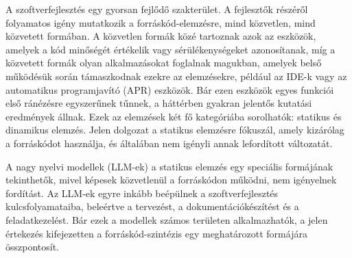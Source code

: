 \documentclass[12pt,a4paper]{extarticle}
\begin{document}
A szoftverfejlesztés egy gyorsan fejlődő szakterület.
A fejlesztők részéről folyamatos igény mutatkozik a forráskód-elemzésre, mind közvetlen, mind közvetett formában.
A közvetlen formák közé tartoznak azok az eszközök, amelyek a kód minőségét értékelik vagy sé\-rü\-lé\-keny\-sé\-ge\-ket azonosítanak, míg a közvetett formák olyan alkalmazásokat foglalnak magukban, amelyek belső működésük során támaszkodnak ezekre az elemzésekre, például az IDE-k vagy az automatikus programjavító (APR) eszközök.
Bár ezen eszközök egyes funkciói első ránézésre egyszerűnek tűnnek, a háttérben gyakran jelentős kutatási e\-red\-mé\-nyek állnak.
Ezek az elemzések két fő kategóriába sorolhatók: statikus és dinamikus elemzés.
Jelen dolgozat a statikus elemzésre fókuszál, amely kizárólag a forráskódot használja, és általában nem igényli annak lefordított változatát.

A nagy nyelvi modellek (LLM-ek) a statikus elemzés egy speciális formájának te\-kint\-he\-tők, mivel képesek közvetlenül a forráskódon működni, nem igényelnek fordítást.
Az LLM-ek egyre inkább beépülnek a szoftverfejlesztés kulcsfolyamataiba, beleértve a tervezést, a dokumentációkészítést és a feladatkezelést.
Bár ezek a modellek számos területen alkalmazhatók, a jelen értekezés kifejezetten a forráskód-szintézis egy meghatározott formájára összpontosít.

\end{document}
